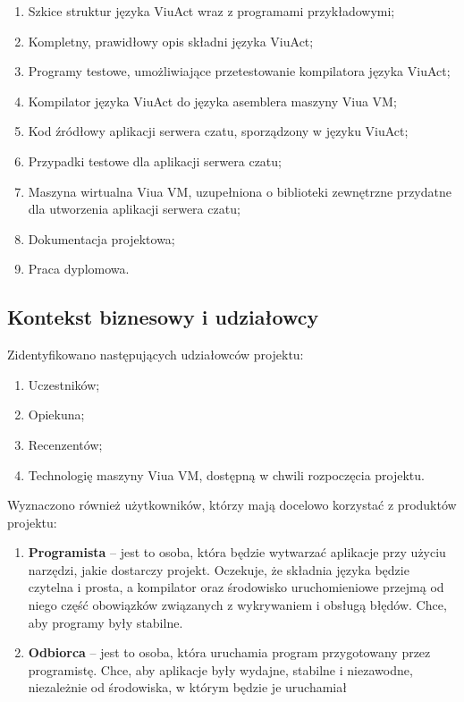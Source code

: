 \documentclass[11pt,oneside,a4paper,titlepage,onecolumn]{article}
\begin{document}
\begin{enumerate}
    \item Szkice struktur języka ViuAct wraz z programami przykładowymi;
    \item Kompletny, prawidłowy opis składni języka ViuAct;
    \item Programy testowe, umożliwiające przetestowanie kompilatora języka ViuAct;
    \item Kompilator języka ViuAct do języka asemblera maszyny Viua VM;
    \item Kod źródłowy aplikacji serwera czatu, sporządzony w języku ViuAct;
    \item Przypadki testowe dla aplikacji serwera czatu;
    \item Maszyna wirtualna Viua VM, uzupełniona o biblioteki zewnętrzne przydatne dla utworzenia aplikacji serwera czatu;
    \item Dokumentacja projektowa;
    \item Praca dyplomowa.
\end{enumerate}

\subsection{Kontekst biznesowy i udziałowcy}

Zidentyfikowano następujących udziałowców projektu:

\begin{enumerate}
	\item Uczestników;
    \item Opiekuna;
    \item Recenzentów;
    \item Technologię maszyny Viua VM, dostępną w chwili rozpoczęcia projektu.
\end{enumerate}

Wyznaczono również użytkowników, którzy mają docelowo korzystać z produktów projektu:

\begin{enumerate}
	\item \textbf{Programista} – jest to osoba, która będzie wytwarzać aplikacje przy użyciu narzędzi, jakie dostarczy projekt. Oczekuje, że składnia języka będzie czytelna i prosta, a kompilator oraz środowisko uruchomieniowe przejmą od niego część obowiązków związanych z wykrywaniem i obsługą błędów. Chce, aby programy były stabilne.
    \item \textbf{Odbiorca} – jest to osoba, która uruchamia program przygotowany przez programistę. Chce, aby aplikacje były wydajne, stabilne i niezawodne, niezależnie od środowiska, w którym będzie je uruchamiał
\end{enumerate}
\end{document}
